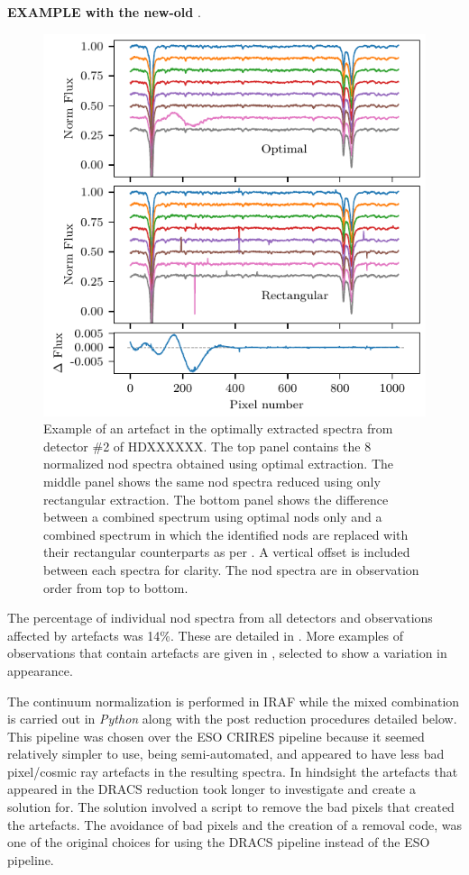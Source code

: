 \textbf{
EXAMPLE with the new-old }.
\begin{figure}
    \centering
    \includegraphics[width=\hsize/2]{figures/reduction/bp_plots/Bad_pixel_replacement}
    \caption{Example of an artefact in the optimally extracted spectra from detector \#2 of {\red{} HDXXXXXX}.
The top panel contains the 8 normalized nod spectra obtained using optimal extraction.
The middle panel shows the same nod spectra reduced using only rectangular extraction.
The bottom panel shows the difference between a combined spectrum using optimal nods only and a combined spectrum in which the identified nods are replaced with their rectangular counterparts as per .
A vertical offset is included between each spectra for clarity.
The nod spectra are in observation order from top to bottom.}
    \label{fig:badpixelreplacement}
\end{figure}

The percentage of individual nod spectra from all detectors and observations affected by artefacts was 14\%.
These are detailed in .
More examples of observations that contain artefacts are given in , selected to show a variation in appearance.


The continuum normalization is performed in {IRAF} while the mixed combination is carried out in \emph{Python} along with the post reduction procedures detailed below.
This pipeline was chosen over the {ESO} {CRIRES} pipeline because it seemed relatively simpler to use, being semi-automated, and appeared to have less bad pixel/cosmic ray artefacts in the resulting spectra.
In hindsight the artefacts that appeared in the {DRACS} reduction took longer to investigate and create a solution for.
The solution involved a script to remove the bad pixels that created the artefacts.
The avoidance of bad pixels and the creation of a removal code, was one of the original choices for using the {DRACS} pipeline instead of the {ESO} pipeline.


